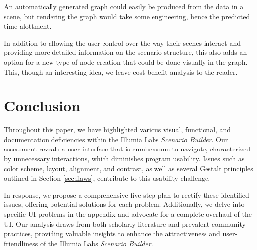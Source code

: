 \documentclass[sigart]{acmart_mod} %
\begin{document}
An automatically generated graph could easily be produced from the data in a scene, but rendering the graph would take some engineering, hence the predicted time alottment.

In addition to allowing the user control over the way their scenes interact and providing more detailed information on the scenario structure, this also adds an option for a new type of node creation that could be done visually in the graph. This, though an interesting idea, we leave cost-benefit analysis to the reader.

\section{Conclusion}

Throughout this paper, we have highlighted various visual, functional, and documentation deficiencies within the Illumia Labs \textit{Scenario Builder}. Our assessment reveals a user interface that is cumbersome to navigate, characterized by unnecessary interactions, which diminishes program usability. Issues such as color scheme, layout, alignment, and contrast, as well as several Gestalt principles outlined in Section \ref{sec:flaws}, contribute to this usability challenge.

In response, we propose a comprehensive five-step plan to rectify these identified issues, offering potential solutions for each problem. Additionally, we delve into specific UI problems in the appendix and advocate for a complete overhaul of the UI. Our analysis draws from both scholarly literature and prevalent community practices, providing valuable insights to enhance the attractiveness and user-friendliness of the Illumia Labs \textit{Scenario Builder}.


\end{document}
